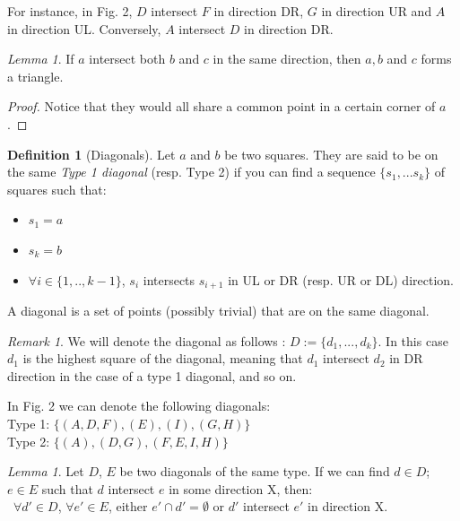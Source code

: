 \documentclass[12pt]{article}
\theoremstyle{definition}
\newtheorem{definition}{Definition}[section]
\theoremstyle{remark}
\newtheorem*{remark}{Remark}
\newtheorem{lemma}[theorem]{Lemma}
\begin{document}
For instance, in Fig. 2, $D$ intersect $F$ in direction DR, $G$ in direction UR and $A$ in direction UL. Conversely, $A$ intersect $D$ in direction DR.

\begin{lemma}
    If $a$ intersect both $b$ and $c$ in the same direction, then $a, b$ and $c$ forms a triangle.
\end{lemma}

\begin{proof}
    Notice that they would all share a common point in a certain corner of $a$.
\end{proof}

\begin{definition}[Diagonals]
    Let $a$ and $b$ be two squares. They are said to be on the same \textit{Type 1 diagonal} (resp. Type 2) if you can find a sequence $\{s_1, ... s_k\}$ of squares such that:
    \begin{itemize}
        \item $s_1 = a$
        \item $s_k = b$
        \item $\forall i \in \{1, .. , k-1\}$, $s_i$ intersects $s_{i+1}$ in UL or DR (resp. UR or DL) direction.
    \end{itemize}    
    A diagonal is a set of points (possibly trivial) that are on the same diagonal. 
\end{definition}

\begin{remark}
    We will denote the diagonal as follows : $D:= \{d_1, ... , d_k\}$. In this case $d_1$ is the highest square of the diagonal, meaning that $d_1$ intersect $d_2$ in DR direction in the case of a type 1 diagonal, and so on.
\end{remark}

In Fig. 2 we can denote the following diagonals:\\
Type 1: $\{(A, D, F), (E), (I), (G, H)\}$\\
Type 2: $\{(A), (D,G), (F, E, I, H)\}$\\


\begin{lemma}
    Let $D$, $E$ be two diagonals of the same type. If we can find $d \in D$; $e \in E$ such that $d$ intersect $e$ in some direction X, then: \\\
    $\forall d' \in D$, $\forall e' \in E$, either $e'\cap d' = \emptyset$ or $d'$ intersect $e'$ in direction X.
\end{lemma}
\end{document}
